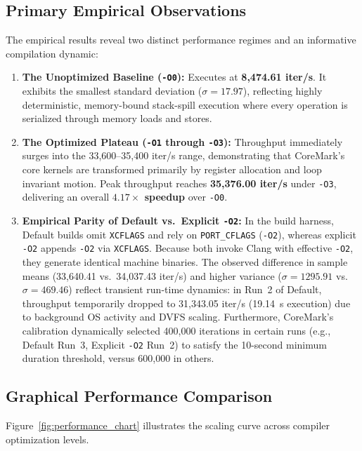 \documentclass[11pt,a4paper]{article}
\begin{document}
\subsection{Primary Empirical Observations}
The empirical results reveal two distinct performance regimes and an informative compilation dynamic:
\begin{enumerate}[leftmargin=1.4em]
    \item \textbf{The Unoptimized Baseline (\texttt{-O0}):} Executes at \textbf{8,474.61 iter/s}. It exhibits the smallest standard deviation ($\sigma = 17.97$), reflecting highly deterministic, memory-bound stack-spill execution where every operation is serialized through memory loads and stores.
    \item \textbf{The Optimized Plateau (\texttt{-O1} through \texttt{-O3}):} Throughput immediately surges into the 33,600--35,400 iter/s range, demonstrating that CoreMark's core kernels are transformed primarily by register allocation and loop invariant motion. Peak throughput reaches \textbf{35,376.00 iter/s} under \texttt{-O3}, delivering an overall \textbf{$4.17\times$ speedup} over \texttt{-O0}.
    \item \textbf{Empirical Parity of Default vs.\ Explicit \texttt{-O2}:} In the build harness, Default builds omit \texttt{XCFLAGS} and rely on \texttt{PORT\_CFLAGS} (\texttt{-O2}), whereas explicit \texttt{-O2} appends \texttt{-O2} via \texttt{XCFLAGS}. Because both invoke Clang with effective \texttt{-O2}, they generate identical machine binaries. The observed difference in sample means (33,640.41 vs.\ 34,037.43 iter/s) and higher variance ($\sigma = 1295.91$ vs.\ $\sigma = 469.46$) reflect transient run-time dynamics: in Run~2 of Default, throughput temporarily dropped to 31,343.05 iter/s (19.14~s execution) due to background OS activity and DVFS scaling. Furthermore, CoreMark's calibration dynamically selected 400,000 iterations in certain runs (e.g., Default Run~3, Explicit \texttt{-O2} Run~2) to satisfy the 10-second minimum duration threshold, versus 600,000 in others.
\end{enumerate}

\clearpage
\subsection{Graphical Performance Comparison}
Figure~\ref{fig:performance_chart} illustrates the scaling curve across compiler optimization levels.
\end{document}
